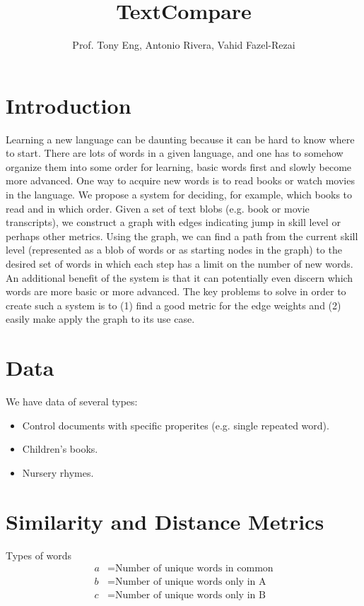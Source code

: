 \documentclass[10pt]{paper}
\title{TextCompare}
\author{Prof. Tony Eng, Antonio Rivera, Vahid Fazel-Rezai}
\begin{document}
\maketitle

\section{Introduction}

Learning a new language can be daunting because it can be hard to know where to start. There are lots of words in a given language, and one has to somehow organize them into some order for learning, basic words first and slowly become more advanced. One way to acquire new words is to read books or watch movies in the language. We propose a system for deciding, for example, which books to read and in which order. Given a set of text blobs (e.g. book or movie transcripts), we construct a graph with edges indicating jump in skill level or perhaps other metrics. Using the graph, we can find a path from the current skill level (represented as a blob of words or as starting nodes in the graph) to the desired set of words in which each step has a limit on the number of new words. An additional benefit of the system is that it can potentially even discern which words are more basic or more advanced. The key problems to solve in order to create such a system is to (1) find a good metric for the edge weights and (2) easily make apply the graph to its use case.

\section{Data}

We have data of several types:
\begin{itemize}
  \item Control documents with specific properites (e.g. single repeated word).
  \item Children's books.
  \item Nursery rhymes.
\end{itemize}

\section{Similarity and Distance Metrics}

Types of words
\begin{align*}
  a &= \text{Number of unique words in common} \\
  b &= \text{Number of unique words only in A} \\
  c &= \text{Number of unique words only in B}
\end{align*}
\end{document}
